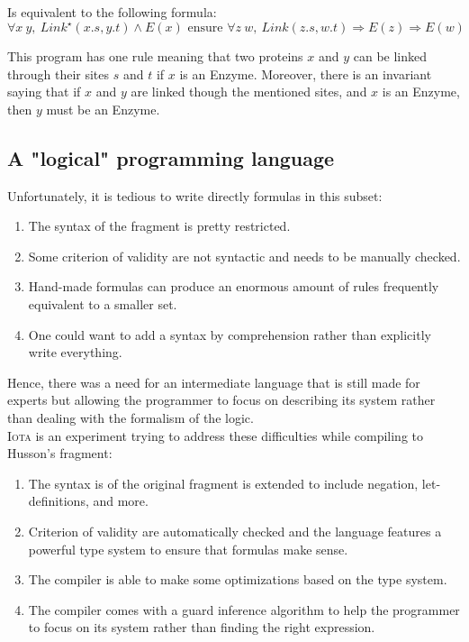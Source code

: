 \documentclass[10pt,a4paper]{article}
\newcommand\Iota{\textsc{Iota}}
\begin{document}
Is equivalent to the following formula:
$$\forall x\ y,\ Link^\star(x.s,y.t) \land E(x) \text{ ensure } \forall z\ w,\ Link(z.s,w.t) \Rightarrow E(z) \Rightarrow E(w) $$

This program has one rule meaning that two proteins $x$ and $y$ can be linked through their sites $s$ and $t$ if $x$ is an Enzyme. Moreover, there is an invariant saying that if $x$ and $y$ are linked though the mentioned sites, and $x$ is an Enzyme, then $y$ must be an Enzyme.

\subsection{A "logical" programming language}
Unfortunately, it is tedious to write directly formulas in this subset:

\begin{enumerate}
\item The syntax of the fragment is pretty restricted.
\item Some criterion of validity are not syntactic and needs to be manually checked.
\item Hand-made formulas can produce an enormous amount of rules frequently equivalent to a smaller set.
\item One could want to add a syntax by comprehension rather than explicitly write everything.
\end{enumerate}

Hence, there was a need for an intermediate language that is still made for experts but allowing the programmer to focus on describing its system rather than dealing with the formalism of the logic.\\
\Iota{} is an experiment trying to address these difficulties while compiling to Husson's fragment:
\begin{enumerate}
\item The syntax is of the original fragment is extended to include negation, let-definitions, and more.
\item Criterion of validity are automatically checked and the language features a powerful type system to ensure that formulas make sense.
\item The compiler is able to make some optimizations based on the type system.
\item The compiler comes with a guard inference algorithm to help the programmer to focus on its system rather than finding the right expression.
\end{enumerate}
\end{document}
